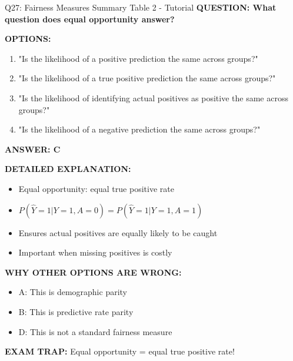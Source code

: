 \documentclass[8pt]{beamer}
\begin{document}
	\begin{frame}{Q27: Fairness Measures Summary Table 2 - Tutorial}
		\fontsize{6.5}{7.5}\selectfont
		\textbf{QUESTION: What question does equal opportunity answer?}
		
		\vspace{0.1cm}
		\textbf{OPTIONS:}
		\begin{enumerate}
			\item "Is the likelihood of a positive prediction the same across groups?"
			\item "Is the likelihood of a true positive prediction the same across groups?"
			\item "Is the likelihood of identifying actual positives as positive the same across groups?"
			\item "Is the likelihood of a negative prediction the same across groups?"
		\end{enumerate}
		
		\vspace{0.1cm}
		\textcolor{myblue}{\textbf{ANSWER: C}}
		
		\vspace{0.1cm}
		\textbf{DETAILED EXPLANATION:}
		\begin{itemize}
			\item Equal opportunity: equal true positive rate
			\item $P(\hat{Y}=1|Y=1,A=0) = P(\hat{Y}=1|Y=1,A=1)$
			\item Ensures actual positives are equally likely to be caught
			\item Important when missing positives is costly
		\end{itemize}
		
		\vspace{0.1cm}
		\textcolor{myred}{\textbf{WHY OTHER OPTIONS ARE WRONG:}}
		\begin{itemize}
			\item \textcolor{myred}{A:} This is demographic parity
			\item \textcolor{myred}{B:} This is predictive rate parity
			\item \textcolor{myred}{D:} This is not a standard fairness measure
		\end{itemize}
		
		\textcolor{myred}{\textbf{EXAM TRAP:}} Equal opportunity = \textcolor{myblue}{equal true positive rate}!
	\end{frame}
	
\end{document}
